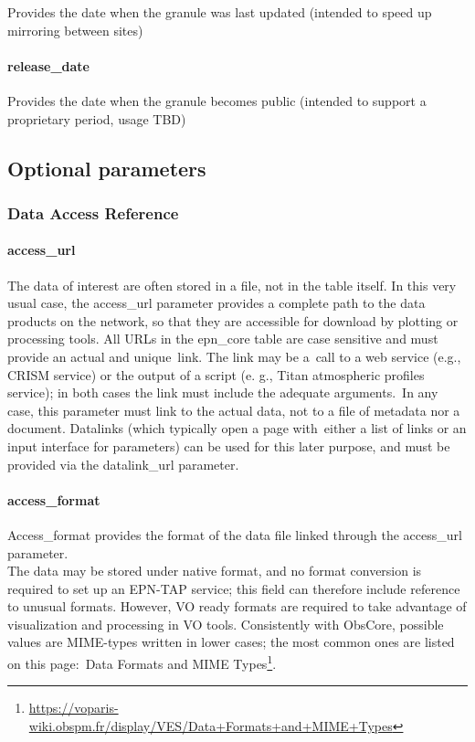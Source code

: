 \documentclass[11pt,a4paper]{ivoa}
\begin{document}
Provides the date when the granule was last updated (intended to speed up mirroring between sites)

\paragraph{release\_date}

Provides the date when the granule becomes public (intended to support a proprietary period, usage TBD)

\subsection{Optional parameters}

\subsubsection{Data Access Reference}

\paragraph{access\_url}

The data of interest are often stored in a file, not in the table itself. In this very usual case, the access\_url parameter provides a complete path to the data products on the network, so that they are accessible for download by plotting or processing tools. All URLs in the epn\_core table are case sensitive and must provide an actual and unique link. The link may be a call to a web service (e.g., CRISM service) or the output of a script (e. g., Titan atmospheric profiles service); in both cases the link must include the adequate arguments. In any case, this parameter must link to the actual data, not to a file of metadata nor a document. Datalinks (which typically open a page with either a list of links or an input interface for parameters) can be used for this later purpose, and must be provided via the datalink\_url parameter. 

\paragraph{access\_format}

Access\_format provides the format of the data file linked through the access\_url parameter. \\The data may be stored under native format, and no format conversion is required to set up an EPN-TAP service; this field can therefore include reference to unusual formats. However, VO ready formats are required to take advantage of visualization and processing in VO tools. Consistently with ObsCore, possible values are MIME-types written in lower cases; the most common ones are listed on this page: Data Formats and MIME Types\footnote{\url{https://voparis-wiki.obspm.fr/display/VES/Data+Formats+and+MIME+Types}}.
\end{document}
